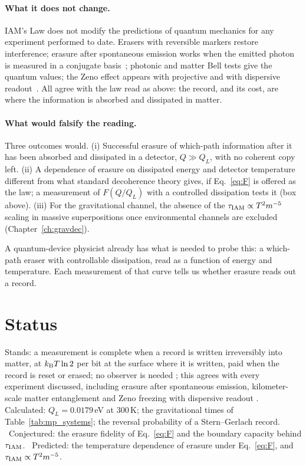 \paragraph{What it does not change.} IAM's Law does not modify the predictions of quantum mechanics for any experiment performed to date. Erasers with
reversible markers restore interference; erasure after spontaneous emission works when the emitted photon is measured in a conjugate
basis~\cite{Blinov2004,Moehring2007,Hensen2015}; photonic and matter Bell tests give the quantum values; the Zeno effect appears with projective and with
dispersive readout~\cite{Itano1990,Slichter2016}. All agree with the law read as above: the record, and its cost, are where the information is absorbed and
dissipated in matter. \observed

\paragraph{What would falsify the reading.} Three outcomes would. (i) Successful erasure of which-path information after it has been absorbed and
dissipated in a detector, $Q\gg Q_L$, with no coherent copy left. (ii) A dependence of erasure on dissipated energy and detector temperature different
from what standard decoherence theory gives, if Eq.~\eqref{eq:F} is offered as the law; a measurement of $F(Q/Q_L)$ with a controlled dissipation tests
it (box above). (iii) For the gravitational channel, the absence of the $\tau_{\rm IAM}\propto T^2m^{-5}$ scaling in massive superpositions once
environmental channels are excluded (Chapter~\ref{ch:gravdec}). \prediction

A quantum-device physicist already has what is needed to probe this: a which-path eraser with controllable dissipation, read as a function of energy and temperature. Each measurement of that curve tells us whether erasure reads out a record.

\section{Status}\label{sec:mp_status}
Stands: a measurement is complete when a record is written irreversibly into matter, at $k_{\mathrm B} T\ln2$ per bit at the surface where it is written, paid
when the record is reset or erased; no observer is needed \interp; this agrees with every experiment discussed, including erasure after spontaneous
emission, kilometer-scale matter entanglement and Zeno freezing with dispersive readout \observed. Calculated: $Q_L=0.0179$\,eV at 300\,K; the gravitational
times of Table~\ref{tab:mp_systems}; the reversal probability of a Stern--Gerlach record. \calc\ Conjectured: the erasure fidelity of Eq.~\eqref{eq:F}
and the boundary capacity behind $\tau_{\rm IAM}$. \conjecture\ Predicted: the temperature dependence of erasure under Eq.~\eqref{eq:F}, and
$\tau_{\rm IAM}\propto T^2m^{-5}$. \prediction
